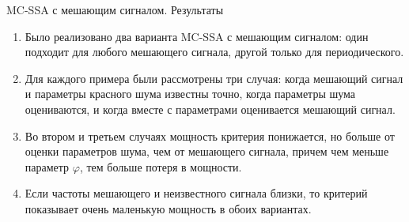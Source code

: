 \documentclass[pdf,notheorems,10pt,intlimits, unicode]{beamer}
\newcommand{\bluetext}[1]{{\usebeamercolor[fg]{bluetext_color}#1}}
\begin{document}
\begin{frame}{MC-SSA с мешающим сигналом. Результаты}
  \begin{enumerate}
    \item Было реализовано два варианта MC-SSA с мешающим сигналом: один подходит для любого мешающего сигнала, другой только для периодического.\medskip
    \item Для каждого примера были рассмотрены три случая: когда мешающий сигнал и параметры красного шума известны точно, когда параметры шума оцениваются, и когда вместе с параметрами оценивается мешающий сигнал.\medskip
    \item Во втором и третьем случаях мощность критерия понижается, но больше от оценки параметров шума, чем от мешающего сигнала, причем чем меньше параметр $\varphi$, тем больше потеря в мощности.\medskip
    \item Если частоты мешающего и неизвестного сигнала близки, то критерий показывает очень маленькую мощность в обоих вариантах.
  \end{enumerate}
\end{frame}







\end{document}
